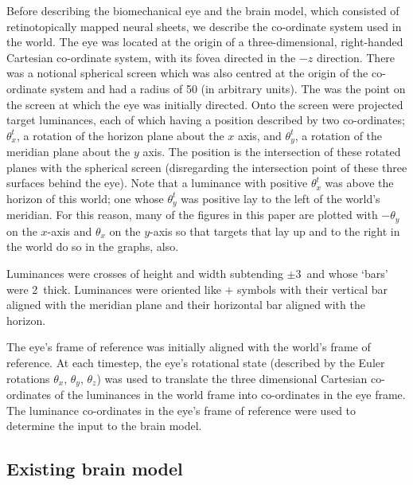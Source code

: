 \documentclass{frontiersSCNS}
\begin{document}
Before describing the biomechanical eye and the brain model, which
consisted of retinotopically mapped neural sheets, we describe the
co-ordinate system used in the world. The eye was located at the
origin of a three-dimensional, right-handed Cartesian co-ordinate
system, with its fovea directed in the $-z$ direction.  There was a
notional spherical screen which was also centred at the origin of the
co-ordinate system and had a radius of 50 (in arbitrary
units). The  was the point on the screen at which
the eye was initially directed.  Onto the screen were projected target
luminances, each of which having a position described by two
co-ordinates; $\theta_{x}^{t}$, a rotation of the horizon plane about
the $x$ axis, and $\theta_{y}^{t}$, a rotation of the meridian plane
about the $y$ axis. The position is the intersection of these rotated
planes with the spherical screen (disregarding the intersection point
of these three surfaces behind the eye).
%
Note that a luminance with positive $\theta_{x}^{t}$ was above the
horizon of this world; one whose $\theta_{y}^{t}$ was positive lay to
the left of the world's meridian. For this reason, many of the figures
in this paper are plotted with $-\theta_{y}$ on the $x$-axis and
$\theta_{x}$ on the $y$-axis so that targets that lay up and to the
right in the world do so in the graphs, also.

Luminances were crosses of height and width subtending $\pm$3\dg~and
whose `bars' were 2\dg~thick. Luminances were oriented like $+$
symbols with their vertical bar aligned with the meridian plane and
their horizontal bar aligned with the horizon.

The eye's frame of reference was initially aligned with the world's
frame of reference.  At each timestep, the eye's rotational state
(described by the Euler rotations $\theta_x$, $\theta_y$, $\theta_z$)
was used to translate the three dimensional Cartesian co-ordinates of
the luminances in the world frame into co-ordinates in the eye
frame. The luminance co-ordinates in the eye's frame of reference were
used to determine the input to the brain model.

\subsection{Existing brain model} \label{sec:methods:existing}
\end{document}

